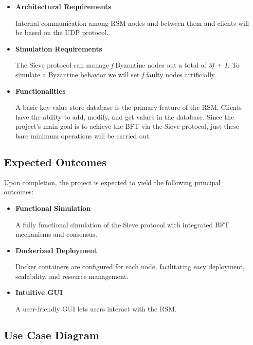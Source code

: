 \documentclass{scrartcl}
\begin{document}
\begin{itemize}
    \item \textbf{Architectural Requirements}

    Internal communication among RSM nodes and between them and clients will be based on the UDP protocol.

    \item \textbf{Simulation Requirements}

    The Sieve protocol can manage \textit{f} Byzantine nodes out a total of \textit{3f + 1}. To simulate a Byzantine behavior we will set \textit{f} faulty nodes artificially.

    \item \textbf{Functionalities}

    A basic key-value store database is the primary feature of the RSM. Clients have the ability to add, modify, and get values in the database. Since the project's main goal is to achieve the BFT via the Sieve protocol, just these bare minimum operations will be carried out.


\end{itemize}

\subsection{Expected Outcomes}

Upon completion, the project is expected to yield the following principal outcomes:

\begin{itemize}
    \item \textbf{Functional Simulation}

    A fully functional simulation of the Sieve protocol with integrated BFT mechanisms and consensus.

    \item \textbf{Dockerized Deployment}

    Docker containers are configured for each node, facilitating easy deployment, scalability, and resource management.

    \item \textbf{Intuitive GUI}

    A user-friendly GUI lets users interact with the RSM.
    
\end{itemize}

\subsection{Use Case Diagram}
\end{document}

